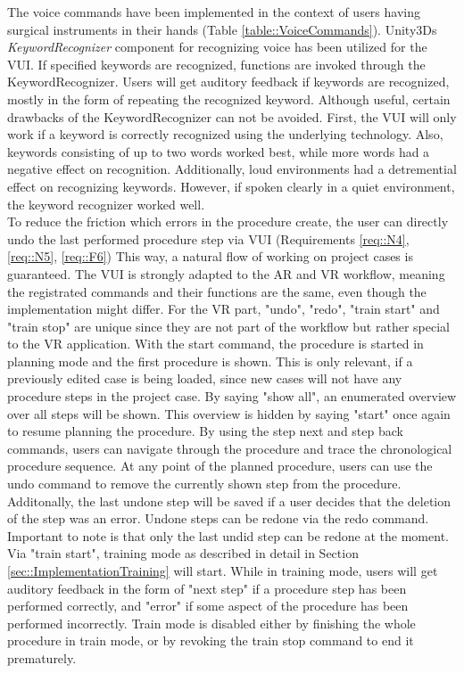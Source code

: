 The voice commands have been implemented in the context of users having surgical instruments in their hands (Table \ref{table::VoiceCommands}).
Unity3Ds \textit{KeywordRecognizer} component for recognizing voice has been utilized for the VUI.
If specified keywords are recognized, functions are invoked through the KeywordRecognizer.
Users will get auditory feedback if keywords are recognized, mostly in the form of repeating the recognized keyword.
Although useful, certain drawbacks of the KeywordRecognizer can not be avoided.
First, the VUI will only work if a keyword is correctly recognized using the underlying technology.
Also, keywords consisting of up to two words worked best, while more words had a negative effect on recognition.
Additionally, loud environments had a detremential effect on recognizing keywords.
However, if spoken clearly in a quiet environment, the keyword recognizer worked well.
\\ To reduce the friction which errors in the procedure create, the user can directly undo the last performed procedure step via VUI (Requirements \ref{req::N4}, \ref{req::N5}, \ref{req::F6})
This way, a natural flow of working on project cases is guaranteed.
The VUI is strongly adapted to the AR and VR workflow, meaning the registrated commands and their functions are the same, even though the implementation might differ.
For the VR part, "undo", "redo", "train start" and "train stop" are unique since they are not part of the workflow but rather special to the VR application.
With the start command, the procedure is started in planning mode and the first procedure is shown.
This is only relevant, if a previously edited case is being loaded, since new cases will not have any procedure steps in the project case.
By saying "show all", an enumerated overview over all steps will be shown. This overview is hidden by saying "start" once again to resume planning the procedure.
By using the step next and step back commands, users can navigate through the procedure and trace the chronological procedure sequence.
At any point of the planned procedure, users can use the undo command to remove the currently shown step from the procedure.
Additonally, the last undone step will be saved if a user decides that the deletion of the step was an error.
Undone steps can be redone via the redo command.
Important to note is that only the last undid step can be redone at the moment.
Via "train start", training mode as described in detail in Section \ref{sec::ImplementationTraining} will start.
While in training mode, users will get auditory feedback in the form of "next step" if a procedure step has been performed correctly, and "error" if some aspect of the procedure has 
been performed incorrectly.
Train mode is disabled either by finishing the whole procedure in train mode, or by revoking the train stop command to end it prematurely.